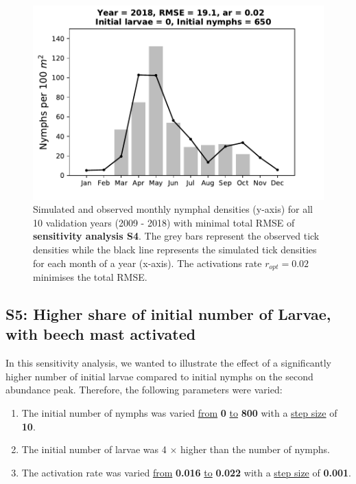 \documentclass[a4paper, 11pt]{scrartcl}
\begin{document}
\begin{figure}[h!]
\begin{minipage}[c]{0.40\linewidth}
\end{minipage}
\begin{minipage}[c]{0.40\linewidth}
\includegraphics[width=\linewidth]{figures/s4/s4_2018}
\end{minipage}
\caption{Simulated and observed monthly nymphal densities (y-axis) for all 10 validation years (2009 - 2018) with minimal total RMSE of \textbf{sensitivity analysis S4}. The
grey bars represent the observed tick densities while the black line represents the simulated tick densities for each month of a year (x-axis). The activations rate
$r_{opt}= 0.02$ minimises the total RMSE.}
\label{fig:independent_initial_ticks_without_beech}
\end{figure}

\newpage
\subsection{S5: Higher share of initial number of Larvae, with beech mast activated}
In this sensitivity analysis, we wanted to illustrate the effect of a significantly higher number of initial larvae compared to initial nymphs on the second abundance peak.
Therefore, the following parameters were varied:

\begin{enumerate}
\item The initial number of nymphs was varied \underline{from} \textbf{0} \underline{to} \textbf{800} with a \underline{step size} of \textbf{10}.
\item The initial number of larvae was 4 $\times$ higher than the number of nymphs.
\item The activation rate was varied \underline{from} \textbf{0.016} \underline{to} \textbf{0.022} with a \underline{step size} of \textbf{0.001}.
\end{enumerate}
\end{document}
